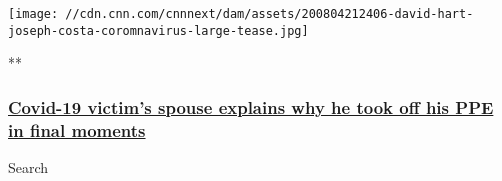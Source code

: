 \texttt{[image: //cdn.cnn.com/cnnnext/dam/assets/200804212406-david-hart-joseph-costa-coromnavirus-large-tease.jpg]}

**

\hypertarget{covid-19-victims-spouse-explains-why-he-took-off-his-ppe-in-final-moments}{%
\subsubsection{\texorpdfstring{\href{/videos/us/2020/08/05/covid-victim-spouse-david-hart-ac360-sot-vpx.cnn}{Covid-19
victim's spouse explains why he took off his PPE in final
moments}}{Covid-19 victim's spouse explains why he took off his PPE in final moments}}\label{covid-19-victims-spouse-explains-why-he-took-off-his-ppe-in-final-moments}}

Search

